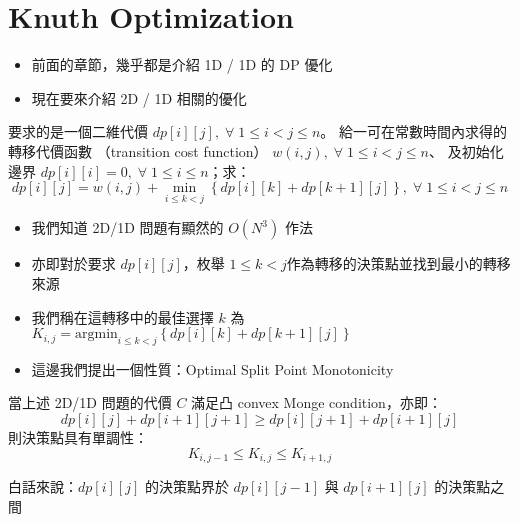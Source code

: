 \documentclass[standalone]{beamer}
\begin{document}
\section{Knuth Optimization}

\begin{frame}{}
  \begin{itemize}
    \item 前面的章節，幾乎都是介紹 1D / 1D 的 DP 優化
    \item 現在要來介紹 2D / 1D 相關的優化
  \end{itemize}
\end{frame}

\begin{frame}{}
  \begin{theorem}[2D/1D 常見形式]
  要求的是一個二維代價 $dp[i][j], \;\forall\; 1\leq i< j\leq n$。
  給一可在常數時間內求得的轉移代價函數 （transition cost function） $w(i,j), \;\forall\; 1\leq i<j\leq n$、
  及初始化邊界 $dp[i][i]=0, \;\forall\; 1\leq i \leq n$；求：
  \[ dp[i][j] = w(i,j) + \min_{i\leq k<j}\left\{dp[i][k]+dp[k+1][j]\right\}, \;\forall\; 1\leq i<j\leq n \]
  \end{theorem}
\end{frame}

\begin{frame}{}
  \begin{itemize}
    \item 我們知道 2D/1D 問題有顯然的 $O(N^3)$ 作法
    \item 亦即對於要求 $dp[i][j]$，枚舉 $1\leq k <j$作為轉移的決策點並找到最小的轉移來源
    \item 我們稱在這轉移中的最佳選擇 $k$ 為 $K_{i,j} = \mathrm{argmin}_{i\leq k<j}\left\{dp[i][k]+dp[k+1][j]\right\}$
    \item 這邊我們提出一個性質：Optimal Split Point Monotonicity
  \end{itemize}
\end{frame}

\begin{frame}{}
  \begin{theorem}
  當上述 2D/1D 問題的代價 $C$ 滿足凸 convex Monge condition，亦即：
  $$ dp[i][j]+dp[i+1][j+1] \geq dp[i][j+1]+dp[i+1][j]$$
  則決策點具有單調性：
  $$ K_{i,j-1} \leq K_{i,j} \leq K_{i+1,j} $$
  \end{theorem}

  白話來說：$dp[i][j]$ 的決策點界於 $dp[i][j-1]$ 與 $dp[i+1][j]$ 的決策點之間
\end{frame}
\end{document}
